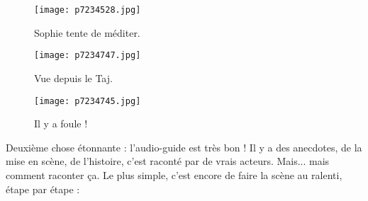 \documentclass{book}
\begin{document}
\begin{figure}[h]
\centering
\texttt{[image: p7234528.jpg]}
\caption*{Sophie tente de méditer.}
\end{figure}


\begin{figure}[h]
\centering
\texttt{[image: p7234747.jpg]}
\caption*{Vue depuis le Taj.}
\end{figure}


\begin{figure}[h]
\centering
\texttt{[image: p7234745.jpg]}
\caption*{Il y a foule !}
\end{figure}

Deuxième chose étonnante : l'audio-guide est très bon ! Il y a des anecdotes, de la mise en scène, de l'histoire, c'est raconté par de vrais acteurs. Mais... mais comment raconter ça. Le plus simple, c'est encore de faire la scène au ralenti, étape par étape :
\end{document}
